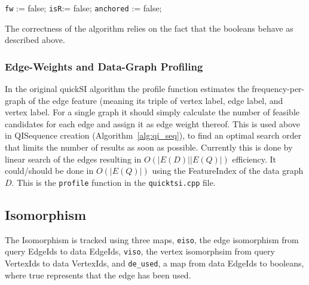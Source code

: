 \begin{algorithm}
  \label{alg:add}
  \caption{$\seq.\texttt{add}(e, Q)$}

  \texttt{fw} := false;
  \texttt{isR}:= false;
  \texttt{anchored} := false;
  
\end{algorithm}

The correctness of the algorithm relies on the fact that the booleans behave as
described above.




\subsubsection{Edge-Weights and Data-Graph Profiling}
In the original quickSI algorithm the profile function estimates the
frequency-per-graph of the edge feature (meaning its triple of vertex label,
edge label, and vertex label.  For a single graph it should simply calculate the
number of feasible candidates for each edge and assign it as edge weight
thereof.  This is used above in QISequence creation
(Algorithm~\ref{alg:qi_seq}), to find an optimal search order that limits the
number of results as soon as possible. Currently this is done by linear search
of the edges resulting in $O(|E(D)||E(Q)|)$ efficiency.  It could/should be done
in $O(|E(Q)|)$ using the FeatureIndex of the data graph $D$. This is the
\texttt{profile} function in the \texttt{quicktsi.cpp} file.


\subsection{Isomorphism}
The Isomorphism is tracked using three maps, \texttt{eiso}, the edge isomorphism
from query EdgeIds to data EdgeIds, \texttt{viso}, the vertex isomorphsim from
query VertexIds to data VertexIds, and \texttt{de\_used}, a map from data
EdgeIds to booleans, where true represents that the edge has been used.

